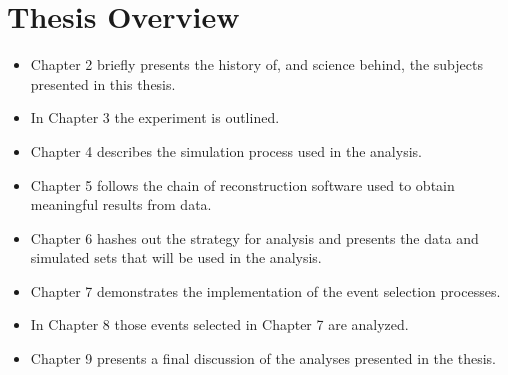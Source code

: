 \section{Thesis Overview}
\label{thesis_overview_section}

\begin{itemize}


\item Chapter 2 briefly presents the history of, and science behind, the
subjects presented in this thesis.

\item In Chapter 3 the experiment is outlined.

\item Chapter 4 describes the simulation process used in the analysis.

\item Chapter 5 follows the chain of reconstruction software used to obtain
meaningful results from data.

\item Chapter 6 hashes out the strategy for analysis and presents the data and
simulated sets that will be used in the analysis.

\item Chapter 7 demonstrates the implementation of the event selection
processes.

\item In Chapter 8 those events selected in Chapter 7 are analyzed.

\item Chapter 9 presents a final discussion of the analyses presented in the
thesis.

\end{itemize}



